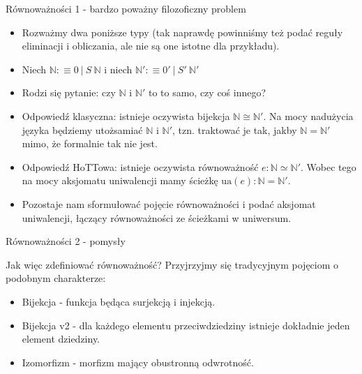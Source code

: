 \documentclass{beamer}
\begin{document}
\begin{frame}{Równoważności 1 - bardzo poważny filozoficzny problem}
\begin{itemize}
	\item Rozważmy dwa poniższe typy (tak naprawdę powinniśmy też podać reguły eliminacji i obliczania, ale nie są one istotne dla przykładu).
	\item Niech $\mathbb{N} :\equiv 0 \: | \: S\ \mathbb{N}$ i niech $\mathbb{N}' :\equiv 0' \: | \: S'\ \mathbb{N}'$
	\item Rodzi się pytanie: czy $\mathbb{N}$ i $\mathbb{N}'$ to to samo, czy coś innego?
	\item Odpowiedź klasyczna: istnieje oczywista bijekcja $\mathbb{N} \cong \mathbb{N}'$. Na mocy nadużycia języka będziemy utożsamiać $\mathbb{N}$ i $\mathbb{N}'$, tzn. traktować je tak, jakby $\mathbb{N} = \mathbb{N}'$ mimo, że formalnie tak nie jest.
	\item Odpowiedź HoTTowa: istnieje oczywista równoważność $e : \mathbb{N} \simeq \mathbb{N}'$. Wobec tego na mocy aksjomatu uniwalencji mamy ścieżkę $\text{ua}(e) : \mathbb{N} = \mathbb{N}'$.
	\item Pozostaje nam sformułować pojęcie równoważności i podać aksjomat uniwalencji, łączący równoważności ze ścieżkami w uniwersum.
\end{itemize}
\end{frame}

\begin{frame}{Równoważności 2 - pomysły}

Jak więc zdefiniować równoważność? Przyjrzyjmy się tradycyjnym pojęciom o podobnym charakterze:
\begin{itemize}
	\item Bijekcja - funkcja będąca surjekcją i injekcją.
	\item Bijekcja v2 - dla każdego elementu przeciwdziedziny istnieje dokładnie jeden element dziedziny.
	\item Izomorfizm - morfizm mający obustronną odwrotność.
\end{itemize}
\end{frame}
\end{document}
